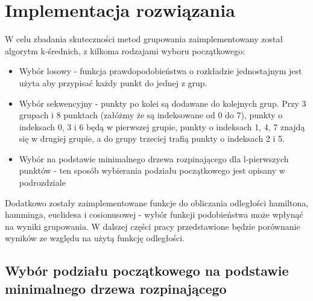 \documentclass{article}
\begin{document}
\section{Implementacja rozwiązania}
W celu zbadania skuteczności metod grupowania zaimplementowany został algorytm k-średnich, z kilkoma rodzajami wyboru początkowego:
\begin{itemize}
	\item Wybór losowy - funkcja prawdopodobieństwa o rozkładzie jednostajnym jest użyta aby przypisać każdy punkt do jednej z grup.
	\item Wybór sekwencyjny - punkty po kolei są dodawane do kolejnych grup. Przy 3 grupach i 8 punktach (załóżmy że są indeksowane od 0 do 7), punkty o indeksach 0, 3 i 6 będą w pierwszej grupie, punkty o indeksach 1, 4, 7 znajdą się w drugiej grupie, a do grupy trzeciej trafią punkty o indeksach 2 i 5.
	\item Wybór na podstawie minimalnego drzewa rozpinającego dla l-pierwszych punktów - ten sposób wybierania podziału początkowego jest opisany w podrozdziale 
\end{itemize}

Dodatkowo zostały zaimplementowane funkcje do obliczania odległości hamiltona, hamminga, euclidesa i cosionusowej - wybór funkcji podobieństwa może wpłynąć na wyniki grupowania. W dalszej części pracy przedstawione będzie porównanie wyników ze względu na użytą funkcję odległości.

\subsection{Wybór podziału początkowego na podstawie minimalnego drzewa rozpinającego}
\end{document}
